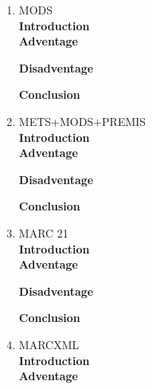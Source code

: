 \documentclass[a4paper]{article} %
\begin{document}
\begin{enumerate}
	\item MODS\\
	{\bf Introduction}\\
	
	{\bf Adventage}
	\begin{enumerate}
		
	\end{enumerate}	
	{\bf Disadventage}
	\begin{enumerate}
		
	\end{enumerate}
	{\bf Conclusion}\\
	
	\item METS+MODS+PREMIS\\
	{\bf Introduction}\\
	
	{\bf Adventage}
	\begin{enumerate}
		
	\end{enumerate}	
	{\bf Disadventage}
	\begin{enumerate}
		
	\end{enumerate}
	{\bf Conclusion}\\
	
	\item MARC 21\\
	{\bf Introduction}\\
	
	{\bf Adventage}
	\begin{enumerate}
		
	\end{enumerate}	
	{\bf Disadventage}
	\begin{enumerate}
		
	\end{enumerate}
	{\bf Conclusion}\\
	
	\item MARCXML\\
	{\bf Introduction}\\
	
	{\bf Adventage}
	\begin{enumerate}
		

\end{enumerate}
\end{enumerate}
\end{document}
